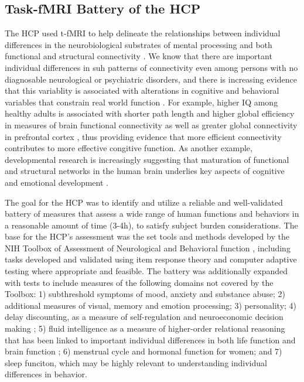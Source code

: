 \subsection{Task-fMRI Battery of the HCP}

The \gls{HCP} used \gls{t-fMRI} to help delineate the relationships between individual differences in the neurobiological substrates of mental processing and both functional and structural connectivity \cite{Barch2013}. We know that there are important individual differences in suh patterns of connectivity even among persons with no diagnosable neurological or psychiatric disorders, and there is increasing evidence that this variablity is associated with alterations in cognitive and behavioral variables that constrain real world function \cite{Basset2009, Song2008, Heuvel2009}. For example, higher \gls{IQ} among healthy adults is associated with shorter path length and higher global efficiency in measures of brain functional connectivity \cite{Li2009} as well as greater global connectivity in prefrontal cortex \cite{Cole2012}, thus providing evidence that more efficient connectivity contributes to more effective congitive function. As another example, developmental research is increasingly suggesting that maturation of functional and structural networks in the human brain underlies key aspects of cognitive and emotional development \cite{Fair2007, Fair2009, Hwang2013, Imperati2011, Stevens2009, Supekar2009, Zuo2010}.

The goal for the \gls{HCP} was to identify and utilize a reliable and well-validated battery of measures that assess a wide range of human functions and behaviors in a reasonable amount of time (3-4\si{\hour}), to satisfy subject burden considerations. The base for the \gls{HCP}'s  assessment was the set tools and methods developed by the \gls{NIH} Toolbox of Assessment of Neurological and Behavioral function \cite{NIH_Toolbox}, including tasks developed and validated using item response theory and computer adaptive testing where appropriate and feasible. The battery was additionally expanded with tests to include measures of the following domains not covered by the Toolbox: 1) subthreshold symptoms of mood, anxiety and substance abuse; 2) additional measures of visual, memory and emotion processing; 3) personality; 4) delay discounting, as a measure of self-regulation and neuroeconomic decision making \cite{Dalley2008, Shamosh2008}; 5) fluid intelligence as a measure of higher-order relational reasoning that has been linked to important individual differences in both life function and brain function \cite{Burgess2011}; 6) menstrual cycle and hormonal function for women; and 7) sleep funciton, which may be highly relevant to understanding individual differences in behavior.

